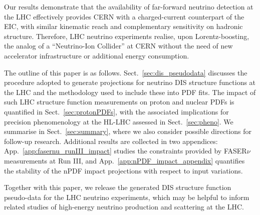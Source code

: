 Our results demonstrate that the availability of far-forward neutrino detection
at the LHC effectively
provides CERN with a charged-current counterpart of the EIC,
with similar kinematic reach and complementary sensitivity on hadronic
structure.
%
Therefore, LHC neutrino experiments realise, upon Lorentz-boosting, the analog of
a ``Neutrino-Ion Collider'' at CERN
without the need of new accelerator infrastructure or additional energy consumption.

The outline of this paper is as follows.
%
Sect.~\ref{sec:dis_pseudodata} discusses the procedure
adopted to generate projections for neutrino DIS structure functions at the LHC
and the methodology used to include these into PDF fits.
%
The impact of such LHC structure function measurements on proton and nuclear
PDFs is quantified in Sect.~\ref{sec:protonPDFs}, with the
associated implications for precision phenomenology
at the HL-LHC assessed in Sect.~\ref{sec:pheno}.
%
We summarise in Sect.~\ref{sec:summary}, where we also consider possible
directions for follow-up research.
%
Additional results are collected in two appendices:
App.~\ref{app:fasernu_runIII_impact} studies the constraints provided by
FASER$\nu$ measurements at Run III, and App.~\ref{app:nPDF_impact_appendix}
quantifies the stability of the nPDF impact projections with respect
to input variations.

Together with this paper,
we release the generated  DIS structure function pseudo-data for the LHC
neutrino experiments, which may be helpful
to inform related studies of high-energy
neutrino production and scattering at the LHC.



